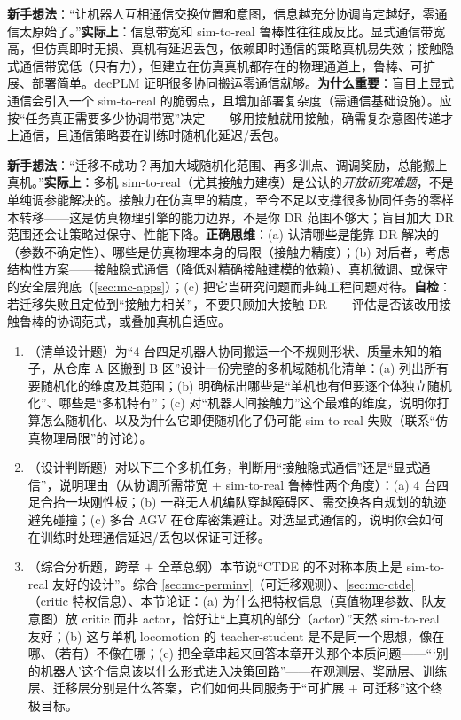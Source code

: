 \begin{pitfall}
\textbf{新手想法}：“让机器人互相通信交换位置和意图，信息越充分协调肯定越好，零通信太原始了。”\textbf{实际上}：信息带宽和 sim-to-real 鲁棒性往往成反比。显式通信带宽高，但仿真即时无损、真机有延迟丢包，依赖即时通信的策略真机易失效；接触隐式通信带宽低（只有力），但建立在仿真真机都存在的物理通道上，鲁棒、可扩展、部署简单。decPLM 证明很多协同搬运零通信就够。\textbf{为什么重要}：盲目上显式通信会引入一个 sim-to-real 的脆弱点，且增加部署复杂度（需通信基础设施）。应按“任务真正需要多少协调带宽”决定——够用接触就用接触，确需复杂意图传递才上通信，且通信策略要在训练时随机化延迟/丢包。
\end{pitfall}

\begin{pitfall}
\textbf{新手想法}：“迁移不成功？再加大域随机化范围、再多训点、调调奖励，总能搬上真机。”\textbf{实际上}：多机 sim-to-real（尤其接触力建模）是公认的\emph{开放研究难题}，不是单纯调参能解决的。接触力在仿真里的精度，至今不足以支撑很多协同任务的零样本转移——这是仿真物理引擎的能力边界，不是你 DR 范围不够大；盲目加大 DR 范围还会让策略过保守、性能下降。\textbf{正确思维}：(a) 认清哪些是能靠 DR 解决的（参数不确定性）、哪些是仿真物理本身的局限（接触力精度）；(b) 对后者，考虑结构性方案——接触隐式通信（降低对精确接触建模的依赖）、真机微调、或保守的安全层兜底（\cref{sec:mc-apps}）；(c) 把它当研究问题而非纯工程问题对待。\textbf{自检}：若迁移失败且定位到“接触力相关”，不要只顾加大接触 DR——评估是否该改用接触鲁棒的协调范式，或叠加真机自适应。
\end{pitfall}

\begin{practice}
\begin{enumerate}
  \item （清单设计题）为“$4$ 台四足机器人协同搬运一个不规则形状、质量未知的箱子，从仓库 A 区搬到 B 区”设计一份完整的多机域随机化清单：(a) 列出所有要随机化的维度及其范围；(b) 明确标出哪些是“单机也有但要逐个体独立随机化”、哪些是“多机特有”；(c) 对“机器人间接触力”这个最难的维度，说明你打算怎么随机化、以及为什么它即便随机化了仍可能 sim-to-real 失败（联系“仿真物理局限”的讨论）。
  \item （设计判断题）对以下三个多机任务，判断用“接触隐式通信”还是“显式通信”，说明理由（从协调所需带宽 $+$ sim-to-real 鲁棒性两个角度）：(a) $4$ 台四足合抬一块刚性板；(b) 一群无人机编队穿越障碍区、需交换各自规划的轨迹避免碰撞；(c) 多台 AGV 在仓库密集避让。对选显式通信的，说明你会如何在训练时处理通信延迟/丢包以保证可迁移。
  \item （综合分析题，跨章 $+$ 全章总纲）本节说“CTDE 的不对称本质上是 sim-to-real 友好的设计”。综合 \cref{sec:mc-perminv}（可迁移观测）、\cref{sec:mc-ctde}（critic 特权信息）、本节论证：(a) 为什么把特权信息（真值物理参数、队友意图）放 critic 而非 actor，恰好让“上真机的部分（actor）”天然 sim-to-real 友好；(b) 这与单机 locomotion 的 teacher-student 是不是同一个思想，像在哪、（若有）不像在哪；(c) 把全章串起来回答本章开头那个本质问题——“‘别的机器人’这个信息该以什么形式进入决策回路”——在观测层、奖励层、训练层、迁移层分别是什么答案，它们如何共同服务于“可扩展 $+$ 可迁移”这个终极目标。
\end{enumerate}
\end{practice}

